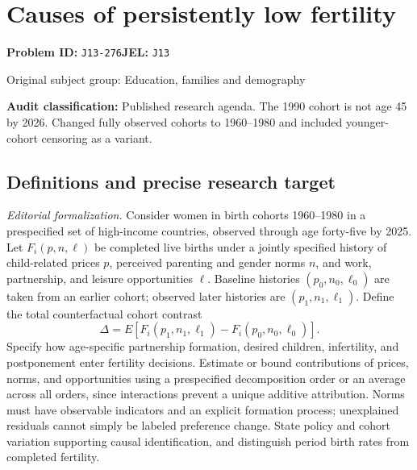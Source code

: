 \documentclass[11pt,a4paper]{article}
\begin{document}
\section*{Causes of persistently low fertility}
\textbf{Problem ID:} \texttt{J13-276}\quad \textbf{JEL:} \texttt{J13}\par
\label{problem:OP-0455}
{\sffamily\small\color{muted}Original subject group: Education, families and demography\par}
\label{definitions:problem:30007737}
\textbf{Audit classification:} Published research agenda. The 1990 cohort is not age 45 by 2026. Changed fully observed cohorts to 1960–1980 and included younger-cohort censoring as a variant.
\subsection*{Definitions and precise research target}
\textit{Editorial formalization.} Consider women in birth cohorts 1960–1980 in a prespecified set of high-income countries, observed through age forty-five by 2025. Let \(F_i(p,n,\ell)\) be completed live births under a jointly specified history of child-related prices \(p\), perceived parenting and gender norms \(n\), and work, partnership, and leisure opportunities \(\ell\). Baseline histories \((p_0,n_0,\ell_0)\) are taken from an earlier cohort; observed later histories are \((p_1,n_1,\ell_1)\). Define the total counterfactual cohort contrast
\[\Delta=E[F_i(p_1,n_1,\ell_1)-F_i(p_0,n_0,\ell_0)].\]
Specify how age-specific partnership formation, desired children, infertility, and postponement enter fertility decisions. Estimate or bound contributions of prices, norms, and opportunities using a prespecified decomposition order or an average across all orders, since interactions prevent a unique additive attribution. Norms must have observable indicators and an explicit formation process; unexplained residuals cannot simply be labeled preference change. State policy and cohort variation supporting causal identification, and distinguish period birth rates from completed fertility.
\end{document}
